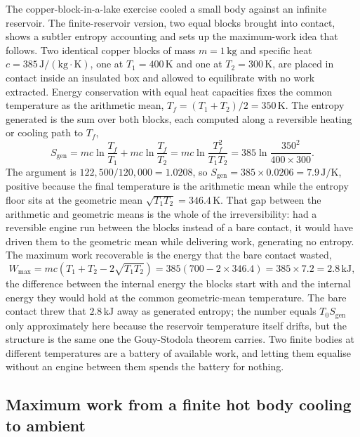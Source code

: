 The copper-block-in-a-lake exercise cooled a small body against an infinite
reservoir. The finite-reservoir version, two equal blocks brought into contact,
shows a subtler entropy accounting and sets up the maximum-work idea that follows.
Two identical copper blocks of mass $m = 1\,\text{kg}$ and specific heat $c =
385\,\text{J}/(\text{kg}\cdot\si{\kelvin})$, one at $T_1 = 400\,\si{\kelvin}$ and
one at $T_2 = 300\,\si{\kelvin}$, are placed in contact inside an insulated box and
allowed to equilibrate with no work extracted. Energy conservation with equal heat
capacities fixes the common temperature as the arithmetic mean, $T_f = (T_1 +
T_2)/2 = 350\,\si{\kelvin}$. The entropy generated is the sum over both blocks,
each computed along a reversible heating or cooling path to $T_f$,
\[
S_{\text{gen}} = mc\ln\frac{T_f}{T_1} + mc\ln\frac{T_f}{T_2}
= mc\ln\frac{T_f^2}{T_1 T_2}
= 385\ln\frac{350^2}{400 \times 300}.
\]
The argument is $122{,}500/120{,}000 = 1.0208$, so $S_{\text{gen}} = 385 \times
0.0206 = 7.9\,\text{J}/\si{\kelvin}$, positive because the final temperature is the
arithmetic mean while the entropy floor sits at the geometric mean $\sqrt{T_1 T_2}
= 346.4\,\si{\kelvin}$. That gap between the arithmetic and geometric means is the
whole of the irreversibility: had a reversible engine run between the blocks
instead of a bare contact, it would have driven them to the geometric mean while
delivering work, generating no entropy. The maximum work recoverable is the
energy that the bare contact wasted,
\[
W_{\max} = mc(T_1 + T_2 - 2\sqrt{T_1 T_2})
= 385(700 - 2\times 346.4) = 385 \times 7.2 = 2.8\,\text{kJ},
\]
the difference between the internal energy the blocks start with and the internal
energy they would hold at the common geometric-mean temperature. The bare contact
threw that $2.8\,\text{kJ}$ away as generated entropy; the number equals
$T_0 S_{\text{gen}}$ only approximately here because the reservoir temperature
itself drifts, but the structure is the same one the Gouy-Stodola theorem carries.
Two finite bodies at different temperatures are a battery of available work, and
letting them equalise without an engine between them spends the battery for
nothing.

\subsection{Maximum work from a finite hot body cooling to ambient}

